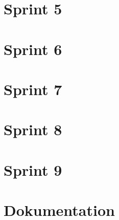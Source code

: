\documentclass[twoside]{report}
\begin{document}


\newpage

\section{Sprint 5}



\newpage

\section{Sprint 6}



\newpage

\section{Sprint 7}



\newpage

\section{Sprint 8}



\newpage

\section{Sprint 9}



\newpage



\section{Dokumentation}
\end{document}
